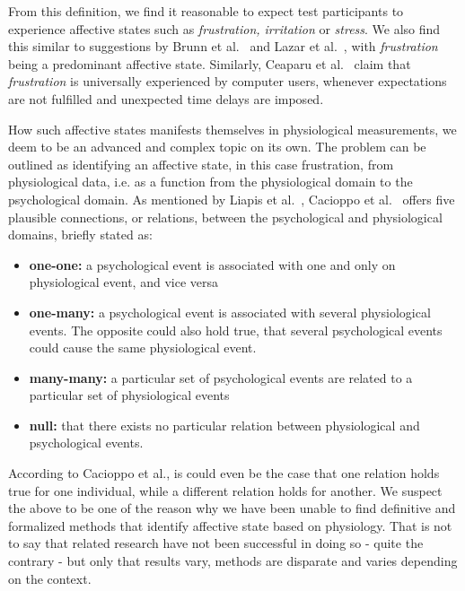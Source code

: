 From this definition, we find it reasonable to expect test participants to experience affective states such as
\textit{frustration, irritation} or \textit{stress}. We also find this similar to suggestions by Brunn et
al.~\cite{LH-paper} and Lazar et al.~\cite{frustration_with_computers}, with \textit{frustration} being a predominant
affective state. Similarly, Ceaparu et al.~\cite{determining-causes-end-user-frust} claim that \textit{frustration} is
universally experienced by computer users, whenever expectations are not fulfilled and unexpected time delays are
imposed.

How such affective states manifests themselves in physiological measurements, we deem to be an advanced and complex
topic on its own. The problem can be outlined as identifying an affective state, in this case frustration, from
physiological data, i.e. as a function from the physiological domain to the psychological domain.  As mentioned by
Liapis et al.~\cite{fusion4}, Cacioppo et al.~\cite[p. 8-9]{handbook-psychophysiology} offers five plausible
connections, or relations, between the psychological and physiological domains, briefly stated as:

\begin{itemize}[noitemsep, nolistsep]
\item \textbf{one-one:} a psychological event is associated with one and only on physiological event, and vice versa
\item \textbf{one-many:} a psychological event is associated with several physiological events. The opposite could also
  hold true, that several psychological events could cause the same physiological event.
\item \textbf{many-many:} a particular set of psychological events are related to a particular set of physiological
  events
\item \textbf{null:} that there exists no particular relation between physiological and psychological events.
\end{itemize}

According to Cacioppo et al., is could even be the case that one relation holds true for one individual, while a
different relation holds for another. We suspect the above to be one of the reason why we have been unable to find
definitive and formalized methods that identify affective state based on physiology. That is not to say that related
research have not been successful in doing so - quite the contrary - but only that results vary, methods are disparate
and varies depending on the context.

